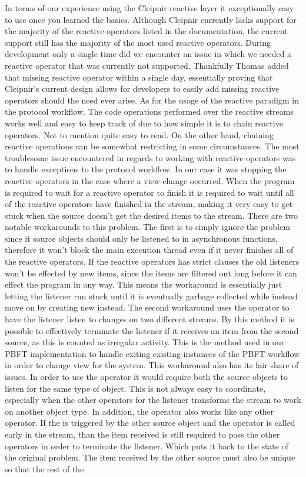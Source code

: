 In terms of our experience using the Cleipnir reactive layer it exceptionally easy to use once you learned the basics. Although Cleipnir currently lacks support for the majority of the reactive operators listed in the documentation, the current support still has the majority of the most used reactive operators. During development only a single time did we encounter an issue in which we needed a reactive operator that was currently not supported. Thankfully Thomas added that missing reactive operator within a single day, essentially proving that Cleipnir's current design allows for developers to easily add missing reactive operators should the need ever arise. As for the usage of the reactive paradigm in the protocol workflow. The code operations performed over the reactive streams works well and easy to keep track of due to how simple it is to chain reactive operators. Not to mention quite easy to read. On the other hand, chaining reactive operations can be somewhat restricting in some circumstances. The most troublesome issue encountered in regards to working with reactive operators was to handle exceptions to the protocol workflow. In our case it was stopping the reactive operators in the case where a view-change occurred. When the program is required to wait for a reactive operator to finish it is required to wait until all of the reactive operators have finished in the stream, making it very easy to get stuck when the source doesn't get the desired items to the stream. There are two notable workarounds to this problem. The first is to simply ignore the problem since it source objects should only be listened to in  asynchronous functions, therefore it won't block the main execution thread even if it never finishes all of the reactive operators. If the reactive operators has strict  clauses the old listeners won't be effected by new items, since the items are filtered out long before it can effect the program in any way. This means the workaround is essentially just letting the listener run stuck until it is eventually garbage collected while instead move on by creating new  instead. The second workaround uses the  operator to have the listener listen to changes on two different streams. By this method it is possible to effectively terminate the listener if it receives an item from the second source, as this is counted as irregular activity. This is the method used in our PBFT implementation to handle exiting existing instances of the PBFT workflow in order to change view for the system. This workaround also has its fair share of issues. In order to use the  operator it would require both the source objects to listen for the same type of object. This is not always easy to coordinate, especially when the other operators for the listener transforms the stream to work on another object type. In addition, the  operator also works like any other operator. If the  is triggered by the other source object and the operator is called early in the stream, than the item received is still required to pass the other operators in order to terminate the listener. Which puts it back to the state of the original problem. The item received by the other source must also be unique so that the rest of the 